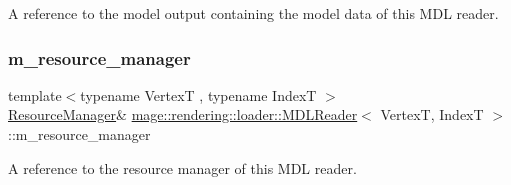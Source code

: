 A reference to the model output containing the model data of this M\+DL reader. \mbox{\label{classmage_1_1rendering_1_1loader_1_1_m_d_l_reader_ae1a276e89104344daa25666e4b074643}} 
\subsubsection{\texorpdfstring{m\+\_\+resource\+\_\+manager}{m\_resource\_manager}}
{\footnotesize\ttfamily template$<$typename VertexT , typename IndexT $>$ \\
\mbox{\hyperlink{classmage_1_1rendering_1_1_resource_manager}{Resource\+Manager}}\& \mbox{\hyperlink{classmage_1_1rendering_1_1loader_1_1_m_d_l_reader}{mage\+::rendering\+::loader\+::\+M\+D\+L\+Reader}}$<$ VertexT, IndexT $>$\+::m\+\_\+resource\+\_\+manager\hspace{0.3cm}{\ttfamily [private]}}

A reference to the resource manager of this M\+DL reader. 
